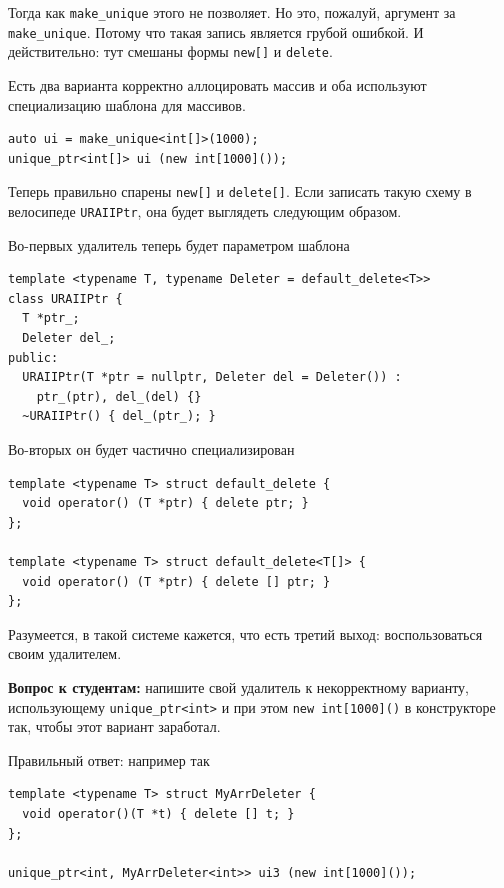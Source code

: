 \documentclass[a4paper,12pt,oneside]{book}
\newif\ifanswers
\begin{document}
Тогда как \lstinline!make_unique! этого не позволяет. Но это, пожалуй, аргумент за \lstinline!make_unique!. Потому что такая запись является грубой ошибкой. И действительно: тут смешаны формы \lstinline!new[]! и \lstinline!delete!.

Есть два варианта корректно аллоцировать массив и оба используют специализацию шаблона для массивов.

\begin{lstlisting}
auto ui = make_unique<int[]>(1000);
unique_ptr<int[]> ui (new int[1000]());
\end{lstlisting}

Теперь правильно спарены \lstinline!new[]! и \lstinline!delete[]!. Если записать такую схему в велосипеде \lstinline!URAIIPtr!, она будет выглядеть следующим образом.

Во-первых удалитель теперь будет параметром шаблона

\begin{lstlisting}
template <typename T, typename Deleter = default_delete<T>> 
class URAIIPtr {
  T *ptr_;
  Deleter del_;
public:
  URAIIPtr(T *ptr = nullptr, Deleter del = Deleter()) :
    ptr_(ptr), del_(del) {}
  ~URAIIPtr() { del_(ptr_); }
\end{lstlisting}

Во-вторых он будет частично специализирован

\begin{lstlisting}
template <typename T> struct default_delete {
  void operator() (T *ptr) { delete ptr; }
};

template <typename T> struct default_delete<T[]> {
  void operator() (T *ptr) { delete [] ptr; }
};
\end{lstlisting}

Разумеется, в такой системе кажется, что есть третий выход: воспользоваться своим удалителем.

\textbf{Вопрос к студентам:} напишите свой удалитель к некорректному варианту, использующему \lstinline!unique_ptr<int>! и при этом \lstinline!new int[1000]()! в конструкторе так, чтобы этот вариант заработал.

\ifanswers
Правильный ответ: например так

\begin{lstlisting}
template <typename T> struct MyArrDeleter {
  void operator()(T *t) { delete [] t; }
};

unique_ptr<int, MyArrDeleter<int>> ui3 (new int[1000]());
\end{lstlisting}
\end{document}
